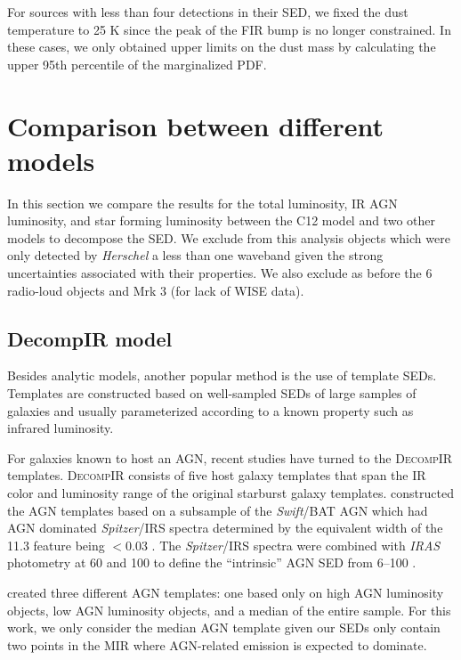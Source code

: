 \documentclass[fleqn, usenatbib]{mnras}
\newcommand{\herschel}{\emph{Herschel}}
\newcommand{\swift}{\textit{Swift}}
\begin{document}
For sources with less than four detections in their SED, we fixed the dust temperature to 25 K since the peak of the FIR bump is no longer constrained. In these cases, we only obtained upper limits on the dust mass by calculating the upper 95th percentile of the marginalized PDF.

\section{Comparison between different models}\label{sec:comp_models}
In this section we compare the results for the total luminosity, IR AGN luminosity, and star forming luminosity between the C12 model and two other models to decompose the SED. We exclude from this analysis objects which were only detected by \herschel{} a less than one waveband given the strong uncertainties associated with their properties. We also exclude as before the 6 radio-loud objects and Mrk 3 (for lack of WISE data). 

\subsection{DecompIR model}
Besides analytic models, another popular method is the use of template SEDs. Templates are constructed based on well-sampled SEDs of large samples of galaxies and usually parameterized according to a known property such as infrared luminosity.

For galaxies known to host an AGN, recent studies have turned to the \textsc{DecompIR} \citep{Mullaney:2011yq} templates. \textsc{DecompIR} consists of five host galaxy templates that span the IR color and luminosity range of the original \citet{Brandl:2006kx} starburst galaxy templates. \citet{Mullaney:2011yq} constructed the AGN templates based on a subsample of the \swift/BAT AGN which had AGN dominated \textit{Spitzer}/IRS spectra determined by the equivalent width of the 11.3 \micron{} feature being $<0.03$ \micron. The \textit{Spitzer}/IRS spectra were combined with \textit{IRAS} photometry at 60 and 100 \micron{} to define the ``intrinsic'' AGN SED from 6--100 \micron. 

\citet{Mullaney:2011yq} created three different AGN templates: one based only on high AGN luminosity objects, low AGN luminosity objects, and a median of the entire sample. For this work, we only consider the median AGN template given our SEDs only contain two points in the MIR where AGN-related emission is expected to dominate. 
\end{document}

